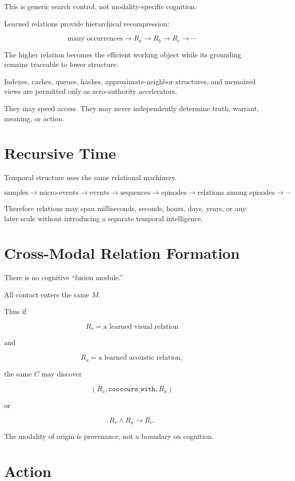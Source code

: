 \documentclass[11pt]{article}
\begin{document}
This is generic search control, not modality-specific cognition.

Learned relations provide hierarchical recompression:

\[
\text{many occurrences}
\rightarrow R_a
\rightarrow R_b
\rightarrow R_c
\rightarrow\cdots
\]

The higher relation becomes the efficient working object while its grounding remains traceable to lower structure.

Indexes, caches, queues, hashes, approximate-neighbor structures, and memoized views are permitted only as zero-authority accelerators.

They may speed access.
They may never independently determine truth, warrant, meaning, or action.

\section{Recursive Time}

Temporal structure uses the same relational machinery.

\[
\text{samples}
\rightarrow
\text{micro-events}
\rightarrow
\text{events}
\rightarrow
\text{sequences}
\rightarrow
\text{episodes}
\rightarrow
\text{relations among episodes}
\rightarrow\cdots
\]

Therefore relations may span milliseconds, seconds, hours, days, years, or any later scale without introducing a separate temporal intelligence.

\section{Cross-Modal Relation Formation}

There is no cognitive ``fusion module.''

All contact enters the same $M$.

Thus if

\[
R_v=\text{a learned visual relation}
\]

and

\[
R_a=\text{a learned acoustic relation},
\]

the same $C$ may discover

\[
(R_v,\texttt{cooccurs\_with},R_a)
\]

or

\[
R_v\land R_a\rightarrow R_e.
\]

The modality of origin is provenance, not a boundary on cognition.

\section{Action}
\end{document}
